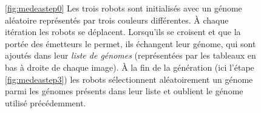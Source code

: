 \documentclass[a4paper,10pt]{report}
\begin{document}
\begin{figure}[H]
\hspace{.1cm}

\caption[Illustration de l'exécution de mEDEA]{\ref{fig:medeastep0} Les trois robots sont initialisés avec un génome aléatoire représentés par trois couleurs différentes.  \`{A} chaque itération les robots se déplacent. Lorsqu'ils se croisent et que la portée des émetteurs le permet, ils échangent leur génome, qui sont ajoutés dans leur \emph{liste de génomes} (représentées par les tableaux en bas à droite de chaque image). \`{A} la fin de la génération (ici l'étape \ref{fig:medeastep3}) les robots sélectionnent aléatoirement un génome parmi les génomes présents dans leur liste et oublient le génome utilisé précédemment.
}
\label{fig:medeaRun}
\end{figure}
\end{document}
